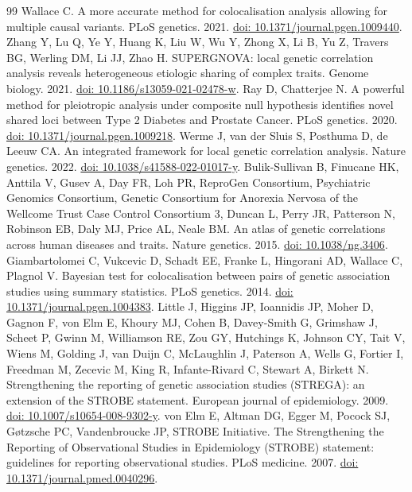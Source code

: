 \documentclass[11pt]{article}
\begin{document}
\begin{thebibliography}{99}
 Wallace C. A more accurate method for colocalisation analysis allowing for multiple causal variants. PLoS genetics. 2021. \href{https://doi.org/10.1371/journal.pgen.1009440}{doi: 10.1371/journal.pgen.1009440}.
 Zhang Y, Lu Q, Ye Y, Huang K, Liu W, Wu Y, Zhong X, Li B, Yu Z, Travers BG, Werling DM, Li JJ, Zhao H. SUPERGNOVA: local genetic correlation analysis reveals heterogeneous etiologic sharing of complex traits. Genome biology. 2021. \href{https://doi.org/10.1186/s13059-021-02478-w}{doi: 10.1186/s13059-021-02478-w}.
 Ray D, Chatterjee N. A powerful method for pleiotropic analysis under composite null hypothesis identifies novel shared loci between Type 2 Diabetes and Prostate Cancer. PLoS genetics. 2020. \href{https://doi.org/10.1371/journal.pgen.1009218}{doi: 10.1371/journal.pgen.1009218}.
 Werme J, van der Sluis S, Posthuma D, de Leeuw CA. An integrated framework for local genetic correlation analysis. Nature genetics. 2022. \href{https://doi.org/10.1038/s41588-022-01017-y}{doi: 10.1038/s41588-022-01017-y}.
 Bulik-Sullivan B, Finucane HK, Anttila V, Gusev A, Day FR, Loh PR, ReproGen Consortium, Psychiatric Genomics Consortium, Genetic Consortium for Anorexia Nervosa of the Wellcome Trust Case Control Consortium 3, Duncan L, Perry JR, Patterson N, Robinson EB, Daly MJ, Price AL, Neale BM. An atlas of genetic correlations across human diseases and traits. Nature genetics. 2015. \href{https://doi.org/10.1038/ng.3406}{doi: 10.1038/ng.3406}.
 Giambartolomei C, Vukcevic D, Schadt EE, Franke L, Hingorani AD, Wallace C, Plagnol V. Bayesian test for colocalisation between pairs of genetic association studies using summary statistics. PLoS genetics. 2014. \href{https://doi.org/10.1371/journal.pgen.1004383}{doi: 10.1371/journal.pgen.1004383}.
 Little J, Higgins JP, Ioannidis JP, Moher D, Gagnon F, von Elm E, Khoury MJ, Cohen B, Davey-Smith G, Grimshaw J, Scheet P, Gwinn M, Williamson RE, Zou GY, Hutchings K, Johnson CY, Tait V, Wiens M, Golding J, van Duijn C, McLaughlin J, Paterson A, Wells G, Fortier I, Freedman M, Zecevic M, King R, Infante-Rivard C, Stewart A, Birkett N. Strengthening the reporting of genetic association studies (STREGA): an extension of the STROBE statement. European journal of epidemiology. 2009. \href{https://doi.org/10.1007/s10654-008-9302-y}{doi: 10.1007/s10654-008-9302-y}.
 von Elm E, Altman DG, Egger M, Pocock SJ, Gøtzsche PC, Vandenbroucke JP, STROBE Initiative. The Strengthening the Reporting of Observational Studies in Epidemiology (STROBE) statement: guidelines for reporting observational studies. PLoS medicine. 2007. \href{https://doi.org/10.1371/journal.pmed.0040296}{doi: 10.1371/journal.pmed.0040296}.

\end{thebibliography}
\end{document}
